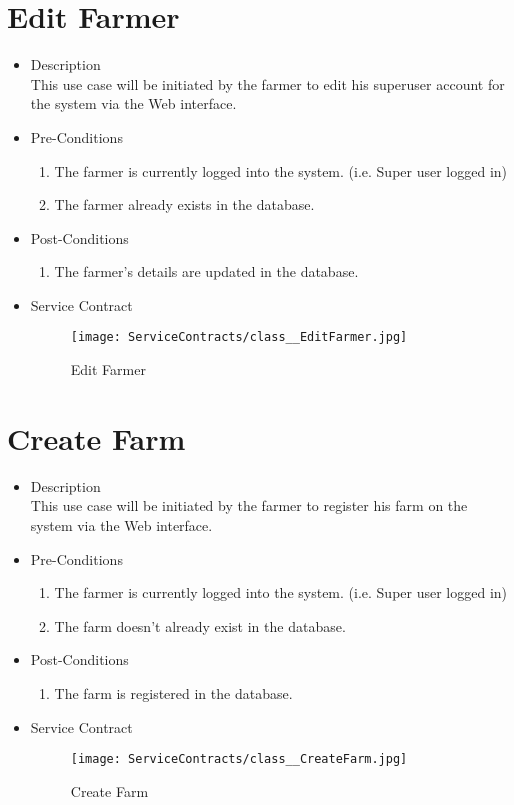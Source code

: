 \documentclass[11pt,fleqn]{book} %
\begin{document}
\section{Edit Farmer}
\begin{itemize}
	\item Description\\
	This use case will be initiated by the farmer to edit his superuser account for the system via the Web interface.
	\item Pre-Conditions
	\begin{enumerate}
		\item The farmer is currently logged into the system. (i.e. Super user logged in)
		\item The farmer already exists in the database.					
	\end{enumerate}
	\item Post-Conditions
	\begin{enumerate}
		\item The farmer’s details are updated in the database.
	\end{enumerate}
	\item Service Contract
	\begin{figure}
		\texttt{[image: ServiceContracts/class\_\_EditFarmer.jpg]}
		\caption{Edit Farmer}
	\end{figure}
\end{itemize}

\section{Create Farm}
\begin{itemize}
	\item Description\\
	This use case will be initiated by the farmer to register his farm on the system via the Web interface.
	\item Pre-Conditions
	\begin{enumerate}
		\item The farmer is currently logged into the system. (i.e. Super user logged in)
		\item The farm doesn’t already exist in the database.
	\end{enumerate}
	\item Post-Conditions
	\begin{enumerate}
		\item The farm is registered in the database.
	\end{enumerate}
	\item Service Contract
	\begin{figure}
		\texttt{[image: ServiceContracts/class\_\_CreateFarm.jpg]}
		\caption{Create Farm}
	\end{figure}
\end{itemize}
\end{document}
